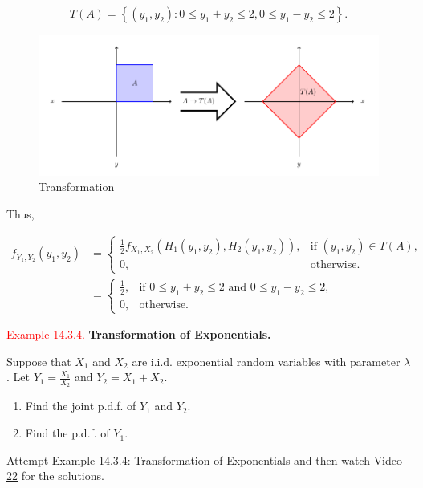 \documentclass[
]{book}
\providecommand{\tightlist}{%
  \setlength{\itemsep}{0pt}\setlength{\parskip}{0pt}}
\begin{document}
\[ T(A)= \left\{ (y_1,y_2): 0\leq y_1+y_2 \leq 2, 0 \leq y_1-y_2 \leq 2 \right\}.\]

\begin{figure}
\includegraphics[width=1\linewidth]{Images/Transform1} \caption{Transformation}\label{fig:transform1}
\end{figure}

Thus,

\begin{align*}
f_{Y_1,Y_2}(y_1,y_2) &= \begin{cases} \frac{1}{2} f_{X_1,X_2}(H_1(y_1,y_2),H_2(y_1,y_2)), & \text{if } (y_1,y_2) \in T(A),\\ 0, & \text{otherwise.}\end{cases} \\[3pt]
&= \begin{cases} \frac{1}{2}, & \text{if } 0 \leq y_1+y_2 \leq 2 \text{ and } 0 \leq y_1-y_2 \leq 2,\\ 0, & \text{otherwise.}\end{cases}
\end{align*}

\hfill\break

\leavevmode{}%
\textcolor{red}{Example 14.3.4.}
{\textbf{Transformation of Exponentials.}}

Suppose that \(X_1\) and \(X_2\) are i.i.d. exponential random variables with parameter \(\lambda\). Let \(Y_1 = \frac{X_1}{X_2}\) and \(Y_2=X_1+X_2\).

\begin{enumerate}
\def\labelenumi{(\alph{enumi})}
\tightlist
\item
  Find the joint p.d.f. of \(Y_1\) and \(Y_2\).\\
\item
  Find the p.d.f. of \(Y_1\).\\
\end{enumerate}

Attempt \protect\hyperlink{Transform:exer:expo}{Example 14.3.4: Transformation of Exponentials} and then watch \protect\hyperlink{video22}{Video 22} for the solutions.
\end{document}
